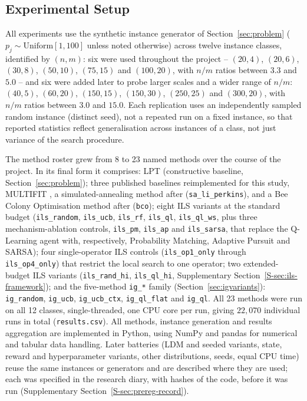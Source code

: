 \documentclass[final,3p,times,11pt,authoryear]{elsarticle}
\begin{document}
\subsection{Experimental Setup}
\label{sec:setup}

All experiments use the synthetic instance generator of
Section~\ref{sec:problem} ($p_j \sim \mathrm{Uniform}[1,100]$ unless
noted otherwise) across twelve instance classes, identified by
$(n,m)$: six were used throughout the project --
$(20,4)$, $(20,6)$, $(30,8)$, $(50,10)$, $(75,15)$ and $(100,20)$, with
$n/m$ ratios between $3.3$ and $5.0$ -- and six were added later to
probe larger scales and a wider range of $n/m$: $(40,5)$, $(60,20)$,
$(150,15)$, $(150,30)$, $(250,25)$ and $(300,20)$, with $n/m$ ratios
between $3.0$ and $15.0$. Each replication uses an independently
sampled random instance (distinct seed), not a repeated run on a
fixed instance, so that reported statistics reflect generalisation
across instances of a class, not just variance of the search
procedure.

The method roster grew from 8 to 23 named methods over the course of
the project. In its final form it comprises: LPT (constructive
baseline, Section~\ref{sec:problem}); three published
baselines reimplemented for this study, MULTIFIT
\citep{CoffmanGareyJohnson1978}, a simulated-annealing method after
\citet{LiPerkins2024} (\texttt{sa\_li\_perkins}), and a Bee Colony
Optimisation method after \citet{DavidovicEtal2012} (\texttt{bco});
eight ILS variants at the standard budget (\texttt{ils\_random},
\texttt{ils\_ucb}, \texttt{ils\_rf}, \texttt{ils\_ql},
\texttt{ils\_ql\_ws}, plus three mechanism-ablation controls,
\texttt{ils\_pm}, \texttt{ils\_ap} and \texttt{ils\_sarsa}, that
replace the Q-Learning agent with, respectively, Probability Matching,
Adaptive Pursuit and SARSA); four single-operator ILS controls
(\texttt{ils\_op1\_only} through \texttt{ils\_op4\_only}) that restrict
the local search to one operator; two extended-budget ILS variants
(\texttt{ils\_rand\_hi}, \texttt{ils\_ql\_hi}, Supplementary Section~\ref{S-sec:ils-framework});
and the five-method \texttt{ig\_*} family (Section~\ref{sec:igvariants}):
\texttt{ig\_random}, \texttt{ig\_ucb}, \texttt{ig\_ucb\_ctx},
\texttt{ig\_ql\_flat} and \texttt{ig\_ql}. All 23 methods were run on
all 12 classes, single-threaded, one CPU core per run, giving
$22{,}070$ individual runs in total (\texttt{results.csv}). All
methods, instance generation and results aggregation are implemented
in Python, using NumPy \citep{HarrisEtal2020} and pandas
\citep{McKinney2010} for numerical and tabular data handling. Later
batteries (LDM and seeded variants, state, reward and hyperparameter
variants, other distributions, seeds, equal CPU time) reuse the same
instances or generators and are described where they are used; each was
specified in the research diary, with hashes of the code, before it was
run (Supplementary Section~\ref{S-sec:prereg-record}).
\end{document}
